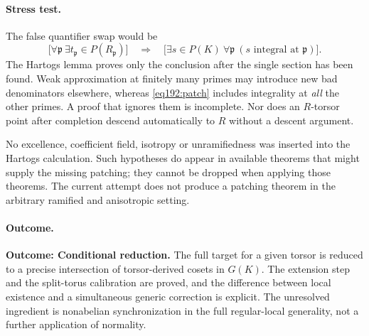 \documentclass[11pt,a4paper]{article}
\numberwithin{equation}{section}
\begin{document}
\paragraph{Stress test.}
The false quantifier swap would be
\[
 \bigl[\forall\mathfrak p\ \exists t_{\mathfrak p}\in P(R_{\mathfrak p})\bigr]
 \quad\Longrightarrow\quad
 \bigl[\exists s\in P(K)\ \forall\mathfrak p\ (s\text{ integral at }\mathfrak p)\bigr].
\]
The Hartogs lemma proves only the conclusion after the single section has been found. Weak approximation at finitely many primes may introduce new bad denominators elsewhere, whereas \eqref{eq192:patch} includes integrality at \emph{all} the other primes. A proof that ignores them is incomplete. Nor does an $R$-torsor point after completion descend automatically to $R$ without a descent argument.

No excellence, coefficient field, isotropy or unramifiedness was inserted into the Hartogs calculation. Such hypotheses do appear in available theorems that might supply the missing patching; they cannot be dropped when applying those theorems. The current attempt does not produce a patching theorem in the arbitrary ramified and anisotropic setting.

\paragraph{Outcome.}
\textbf{Outcome: Conditional reduction.}
The full target for a given torsor is reduced to a precise intersection of torsor-derived cosets in $G(K)$. The extension step and the split-torus calibration are proved, and the difference between local existence and a simultaneous generic correction is explicit. The unresolved ingredient is nonabelian synchronization in the full regular-local generality, not a further application of normality.

\end{document}
